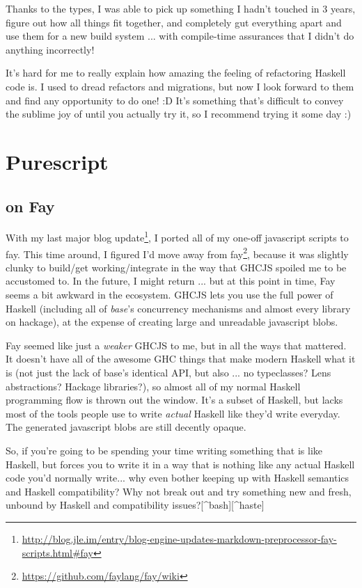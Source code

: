 \documentclass[]{article}
\renewcommand{\href}[2]{#2\footnote{\url{#1}}}
\begin{document}
Thanks to the types, I was able to pick up something I hadn't touched in 3
years, figure out how all things fit together, and completely gut everything
apart and use them for a new build system ... with compile-time assurances that
I didn't do anything incorrectly!

It's hard for me to really explain how amazing the feeling of refactoring
Haskell code is. I used to dread refactors and migrations, but now I look
forward to them and find any opportunity to do one! :D It's something that's
difficult to convey the sublime joy of until you actually try it, so I recommend
trying it some day :)

\section{Purescript}

\subsection{on Fay}

With my
\href{http://blog.jle.im/entry/blog-engine-updates-markdown-preprocessor-fay-scripts.html\#fay}{last
major blog update}, I ported all of my one-off javascript scripts to fay. This
time around, I figured I'd move away from
\href{https://github.com/faylang/fay/wiki}{fay}, because it was slightly clunky
to build/get working/integrate in the way that GHCJS spoiled me to be accustomed
to. In the future, I might return ... but at this point in time, Fay seems a bit
awkward in the ecosystem. GHCJS lets you use the full power of Haskell
(including all of \emph{base}'s concurrency mechanisms and almost every library
on hackage), at the expense of creating large and unreadable javascript blobs.

Fay seemed like just a \emph{weaker} GHCJS to me, but in all the ways that
mattered. It doesn't have all of the awesome GHC things that make modern Haskell
what it is (not just the lack of base's identical API, but also ... no
typeclasses? Lens abstractions? Hackage libraries?), so almost all of my normal
Haskell programming flow is thrown out the window. It's a subset of Haskell, but
lacks most of the tools people use to write \emph{actual} Haskell like they'd
write everyday. The generated javascript blobs are still decently opaque.

So, if you're going to be spending your time writing something that is like
Haskell, but forces you to write it in a way that is nothing like any actual
Haskell code you'd normally write... why even bother keeping up with Haskell
semantics and Haskell compatibility? Why not break out and try something new and
fresh, unbound by Haskell and compatibility issues?{[}\^{}bash{]}{[}\^{}haste{]}
\end{document}
